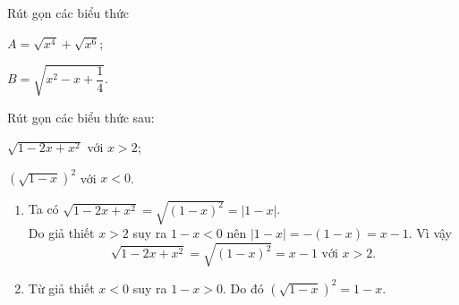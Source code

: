 \begin{vd}%
	Rút gọn các biểu thức 
	\begin{listEX}[2]
	\item $A =\sqrt{x^4} + \sqrt{x^6}$;
	\item $B =\sqrt{x^2 - x + \dfrac{1}{4}}$.
	\end{listEX}	
\end{vd}
\begin{vd}
	Rút gọn các biểu thức sau:
	\begin{listEX}[2]
	\item $\sqrt{1-2 x+x^2}$ với $x>2$;
	\item $\left(\sqrt{1-x}\right)^2$ với $x<0$.
	\end{listEX}
	\loigiai
	{
	\begin{enumerate}
	\item Ta có $\sqrt{1-2 x+x^2}=\sqrt{(1-x)^2}=|1-x|$.\\
	Do giả thiết $x>2$ suy ra $1-x<0$ nên $|1-x|=-(1-x)=x-1$. Vì vậy
	$$
	\sqrt{1-2 x+x^2}=\sqrt{(1-x)^2}=x-1 \text { với } x>2.
	$$
	\item Từ giả thiết $x<0$ suy ra $1-x>0$. Do đó
	$
	\left(\sqrt{1-x}\right)^2=1-x.
	$
	\end{enumerate}	
	}
\end{vd}
